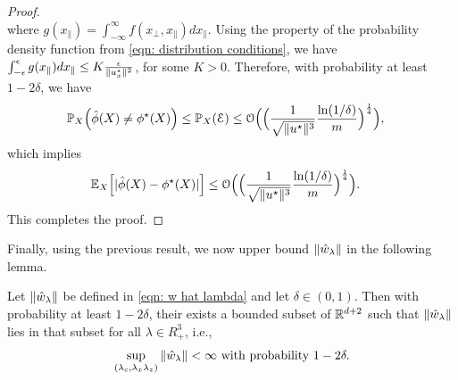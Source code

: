 \begin{proof}
\begin{equation*}
\end{equation*}
where $g(x_\parallel) = \int_{-\infty}^\infty f(x_\perp,x_\parallel)dx_\parallel$.
Using the property of the probability density function from \eqref{eqn: distribution conditions}, we have
$\int_{-\epsilon}^{\epsilon} g(x_\parallel) dx_{\parallel} \leq K\frac{\epsilon}{\|u^\star_x\|^2}$, for some $K > 0$.
Therefore, with probability at least $1-2\delta$, we have
\begin{equation*}
\begin{aligned}
   \mathbb{P}_{X}\Big(\hat{\phi}(X) \neq \phi^\star(X)\Big) &\leq \mathbb{P}_X(\mathcal{E}) \leq
   \mathcal{O}\Big(\Big(\frac{1}{\sqrt{\|u^\star\|^3}}\frac{\ln(1/\delta)}{m}\Big)^{\frac{1}{4}}\Big),
\end{aligned}
\end{equation*}
which implies
\begin{equation*}
\begin{aligned}
   \mathbb{E}_X\Big[|\hat{\phi}(X)-\phi^\star(X)|\Big] &\leq
   \mathcal{O}\Big(\Big(\frac{1}{\sqrt{\|u^\star\|^3}}\frac{\ln(1/\delta)}{m}\Big)^{\frac{1}{4}}\Big).
\end{aligned}
\end{equation*}
This completes the proof.
\end{proof}


Finally, using the previous result, we now upper bound $\|\hat{w}_\lambda\|$ in  the following lemma.

\begin{lem}\label{lem: whl bounding} Let $\|\hat{w}_\lambda\|$ be defined in \eqref{eqn: w hat lambda} and let $\delta \in (0,1)$. Then with probability at least $1-2\delta$, their exists a bounded subset of $\mathbb{R}^{d+2}$ such that $\|\hat{w}_\lambda\|$ lies in that subset for all $\lambda \in R^3_+$, i.e.,
    \begin{equation*}
        \sup_{(\lambda_c,\lambda_x\lambda_z)}\|\hat{w}_\lambda\| < \infty \text{ with probability } 1-2\delta.
    \end{equation*}
\end{lem}

